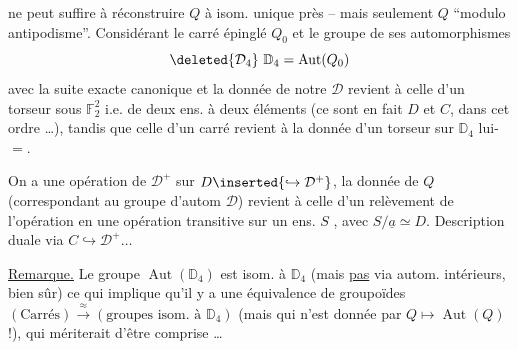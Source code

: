 
ne peut suffire à réconstruire $Q$ à isom. unique près -- mais seulement $Q$ ``modulo antipodisme''. Considérant le carré épinglé $Q_0$ et le groupe de ses automorphismes
\[
\deleted{\mathcal D_4}\ \mathbb D_4=\operatorname{Aut}(Q_0)
\]
avec la suite exacte canonique
et la donnée de notre $\mathcal D$ revient à celle d'un torseur sous  $\mathbb F_2^2$  i.e. de deux ens. à deux éléments (ce sont en fait $D$ et $C$, dans cet ordre \ldots), tandis que celle d'un carré revient à la donnée d'un torseur sur $\mathbb D_4$ lui-$=$.

On a une opération  de $\mathcal D^+$ sur $D\inserted{\hookrightarrow\mathcal D^+}$, la donnée de $Q$ (correspondant au groupe d'autom $\mathcal D$)  revient à celle d'un relèvement de   l'opération  en  une opération  transitive sur un ens. $S$ , avec $S/\underline a\simeq D$. Description duale via $C\hookrightarrow\mathcal D^+\ldots$

\uline{Remarque.} Le groupe $\operatorname{Aut}(\mathbb D_4)$ est isom. à $\mathbb D_4$ (mais \uline{pas} via autom. intérieurs, bien sûr) ce qui implique qu'il y a  une équivalence de groupoïdes $(\text{Carrés})\xrightarrow{\approx}(\text{groupes isom. à }\mathbb D_4)$ (mais qui n'est  donnée par  $Q\mapsto\operatorname{Aut}(Q)$ !), qui mériterait d'être comprise \ldots


